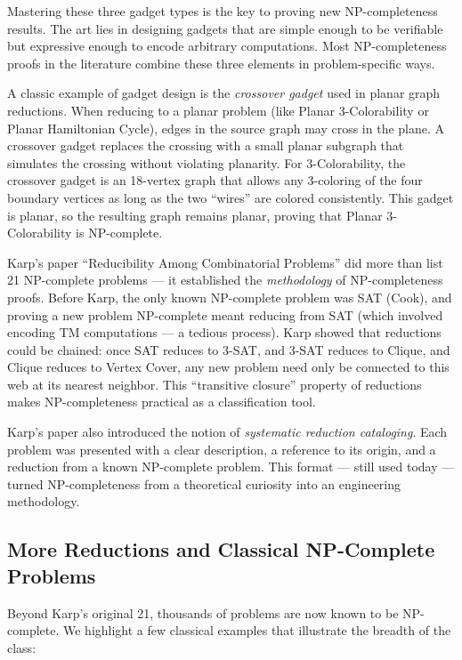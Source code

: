Mastering these three gadget types is the key to proving new NP-completeness results. The art lies in designing gadgets that are simple enough to be verifiable but expressive enough to encode arbitrary computations. Most NP-completeness proofs in the literature combine these three elements in problem-specific ways.

A classic example of gadget design is the \emph{crossover gadget} used in planar graph reductions. When reducing to a planar problem (like Planar 3-Colorability or Planar Hamiltonian Cycle), edges in the source graph may cross in the plane. A crossover gadget replaces the crossing with a small planar subgraph that simulates the crossing without violating planarity. For 3-Colorability, the crossover gadget is an 18-vertex graph that allows any 3-coloring of the four boundary vertices as long as the two ``wires'' are colored consistently. This gadget is planar, so the resulting graph remains planar, proving that Planar 3-Colorability is NP-complete.

Karp's paper ``Reducibility Among Combinatorial Problems'' did more than list 21 NP-complete problems — it established the \emph{methodology} of NP-completeness proofs. Before Karp, the only known NP-complete problem was SAT (Cook), and proving a new problem NP-complete meant reducing from SAT (which involved encoding TM computations — a tedious process). Karp showed that reductions could be chained: once SAT reduces to 3-SAT, and 3-SAT reduces to Clique, and Clique reduces to Vertex Cover, any new problem need only be connected to this web at its nearest neighbor. This ``transitive closure'' property of reductions makes NP-completeness practical as a classification tool.

Karp's paper also introduced the notion of \emph{systematic reduction cataloging}. Each problem was presented with a clear description, a reference to its origin, and a reduction from a known NP-complete problem. This format — still used today — turned NP-completeness from a theoretical curiosity into an engineering methodology.

\subsection{More Reductions and Classical NP-Complete Problems}

Beyond Karp's original 21, thousands of problems are now known to be NP-complete. We highlight a few classical examples that illustrate the breadth of the class:

